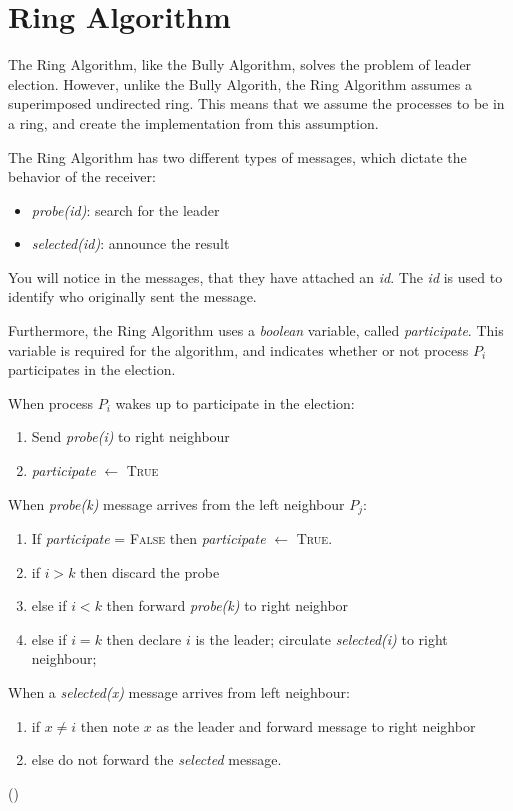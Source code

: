 \documentclass{report}
\begin{document}
\section{Ring Algorithm}

The Ring Algorithm, like the Bully Algorithm, solves the problem of leader election. However, unlike the Bully Algorith, the Ring Algorithm assumes a superimposed undirected ring. This means that we assume the processes to be in a ring, and create the implementation from this assumption.

The Ring Algorithm has two different types of messages, which dictate the behavior of the receiver:
\begin{itemize}
  \item \textit{probe(id)}: search for the leader
  \item \textit{selected(id)}: announce the result
\end{itemize}

You will notice in the messages, that they have attached an \textit{id}. The \textit{id} is used to identify who originally sent the message.

Furthermore, the Ring Algorithm uses a \textit{boolean} variable, called \textit{participate}. This variable is required for the algorithm, and indicates whether or not process $P_{i}$ participates in the election.

\noindent
When process $P_{i}$ wakes up to participate in the election:
\begin{enumerate}
  \item Send \textit{probe(i)} to right neighbour
        \item \textit{participate } $\leftarrow $ \textsc{True}
\end{enumerate}

\noindent
When \textit{probe(k)} message arrives from the left neighbour $P_{j}$:
\begin{enumerate}
  \item If \textit{participate} = \textsc{False} then \textit{participate} $\leftarrow$ \textsc{True}.
  \item if $i > k$ then discard the probe
  \item else if $i < k$ then forward \textit{probe(k)} to right neighbor
  \item else if $i = k$ then declare $i$ is the leader; circulate \textit{selected(i)} to right neighbour;
\end{enumerate}

\noindent
When a \textit{selected(x)} message arrives from left neighbour:
\begin{enumerate}
  \item if $x \neq i$ then note $x$ as the leader and forward message to right neighbor
        \item else do not forward the \textit{selected} message.
\end{enumerate}
(\cite{kshemkalyani2011distributed})
\end{document}
